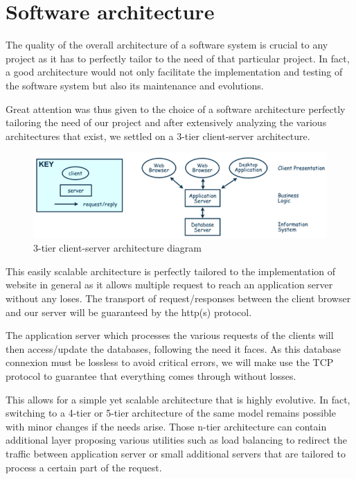 \section{Software architecture}

The quality of the overall architecture of a software system is crucial to
any project as it has to perfectly tailor to the need of that particular
project. In fact, a good architecture would not only facilitate the
implementation and testing of the software system but also its maintenance
and evolutions.\newline

Great attention was thus given to the choice of a software architecture
perfectly tailoring the need of our project and after extensively analyzing
the various architectures that exist, we settled on a 3-tier client-server
architecture. \newline

\begin{figure}[H]
	\centering
	\includegraphics[width=0.9\linewidth]{ClientServerArchitecture.png}
	\caption{3-tier client-server architecture diagram}
	\label{fig:length_eight_mouse}
\end{figure}

This easily scalable architecture is perfectly tailored to the
implementation of website in general as it allows multiple request to reach
an application server without any loses. The transport of request/responses
between the client browser and our server will be guaranteed by the http(s)
protocol. \newline

The application server which processes the various requests of the clients
will then access/update the databases, following the need it faces. As this
database connexion must be lossless to avoid critical errors, we will make
use the TCP protocol to guarantee that everything comes through without
losses. \newline

This allows for a simple yet scalable architecture that is highly evolutive.
In fact, switching to a 4-tier or 5-tier architecture of the same model
remains possible with minor changes if the needs arise. Those n-tier
architecture can contain additional layer proposing various utilities such
as load balancing to redirect the traffic between application server or
small additional servers that are tailored to process a certain part of the
request. \newline

